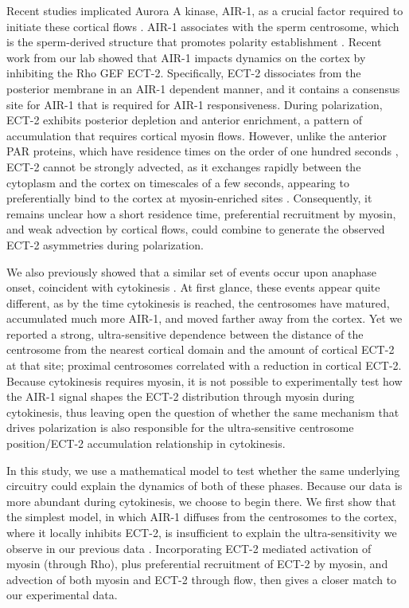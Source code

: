 \documentclass[11pt]{article}
\begin{document}
Recent studies implicated Aurora A kinase, AIR-1, as a crucial factor required to initiate these cortical flows \citep{klinkert2019aurora,kapoor2019centrosome, longhini2022aurora}. AIR-1 associates with the sperm centrosome, which is the sperm-derived structure that promotes polarity establishment \citep{hannak2001aurora}. Recent work from our lab \citep{longhini2022aurora} showed that AIR-1 impacts dynamics on the cortex by inhibiting the Rho GEF ECT-2. Specifically, ECT-2 dissociates from the posterior membrane in an AIR-1 dependent manner, and it contains a consensus site for AIR-1 that is required for AIR-1 responsiveness. During polarization, ECT-2 exhibits posterior depletion and anterior enrichment, a pattern of accumulation that requires cortical myosin flows. However, unlike the anterior PAR proteins, which have residence times on the order of one hundred seconds \citep{robin2014single}, ECT-2 cannot be strongly advected, as it exchanges rapidly between the cytoplasm and the cortex on timescales of a few seconds, appearing to preferentially bind to the cortex at myosin-enriched sites \citep{longhini2022aurora}. Consequently, it remains unclear how a short residence time, preferential recruitment by myosin, and weak advection by cortical flows, could combine to generate the observed ECT-2 asymmetries during polarization. 

We also previously showed that a similar set of events occur upon anaphase onset, coincident with cytokinesis \citep{longhini2022aurora}. At first glance, these events appear quite different, as by the time cytokinesis is reached, the centrosomes have matured,  accumulated much more \mbox{AIR-1}, and moved farther away from the cortex. Yet we reported a strong, ultra-sensitive dependence between the distance of the centrosome from the nearest cortical domain and the amount of cortical ECT-2 at that site; proximal centrosomes correlated with a reduction in cortical ECT-2. Because cytokinesis requires myosin, it is not possible to experimentally test how the AIR-1 signal shapes the ECT-2 distribution through myosin during cytokinesis, thus leaving open the question of whether the same mechanism that drives polarization is also responsible for the ultra-sensitive centrosome position/ECT-2 accumulation relationship in cytokinesis.

In this study, we use a mathematical model to test whether the same underlying circuitry could explain the dynamics of both of these phases. Because our data is more abundant during cytokinesis, we choose to begin there. We first show that the simplest model, in which AIR-1 diffuses from the centrosomes to the cortex, where it locally inhibits ECT-2, is insufficient to explain the ultra-sensitivity we observe in our previous data \citep[Fig.~7A]{longhini2022aurora}. Incorporating ECT-2 mediated activation of myosin (through Rho), plus preferential recruitment of ECT-2 by myosin, and advection of both myosin and ECT-2 through flow, then gives a closer match to our experimental data. 
\end{document}
